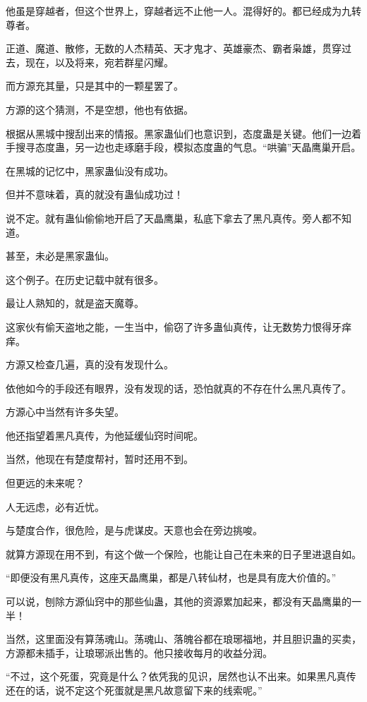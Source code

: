 \begin{this_body}
他虽是穿越者，但这个世界上，穿越者远不止他一人。混得好的。都已经成为九转尊者。

正道、魔道、散修，无数的人杰精英、天才鬼才、英雄豪杰、霸者枭雄，贯穿过去，现在，以及将来，宛若群星闪耀。

而方源充其量，只是其中的一颗星罢了。

方源的这个猜测，不是空想，他也有依据。

根据从黑城中搜刮出来的情报。黑家蛊仙们也意识到，态度蛊是关键。他们一边着手搜寻态度蛊，另一边也走琢磨手段，模拟态度蛊的气息。“哄骗”天晶鹰巢开启。

在黑城的记忆中，黑家蛊仙没有成功。

但并不意味着，真的就没有蛊仙成功过！

说不定。就有蛊仙偷偷地开启了天晶鹰巢，私底下拿去了黑凡真传。旁人都不知道。

甚至，未必是黑家蛊仙。

这个例子。在历史记载中就有很多。

最让人熟知的，就是盗天魔尊。

这家伙有偷天盗地之能，一生当中，偷窃了许多蛊仙真传，让无数势力恨得牙痒痒。

方源又检查几遍，真的没有发现什么。

依他如今的手段还有眼界，没有发现的话，恐怕就真的不存在什么黑凡真传了。

方源心中当然有许多失望。

他还指望着黑凡真传，为他延缓仙窍时间呢。

当然，他现在有楚度帮衬，暂时还用不到。

但更远的未来呢？

人无远虑，必有近忧。

与楚度合作，很危险，是与虎谋皮。天意也会在旁边挑唆。

就算方源现在用不到，有这个做一个保险，也能让自己在未来的日子里进退自如。

“即便没有黑凡真传，这座天晶鹰巢，都是八转仙材，也是具有庞大价值的。”

可以说，刨除方源仙窍中的那些仙蛊，其他的资源累加起来，都没有天晶鹰巢的一半！

当然，这里面没有算荡魂山。荡魂山、落魄谷都在琅琊福地，并且胆识蛊的买卖，方源都未插手，让琅琊派出售的。他只接收每月的收益分润。

“不过，这个死蛋，究竟是什么？依凭我的见识，居然也认不出来。如果黑凡真传还在的话，说不定这个死蛋就是黑凡故意留下来的线索呢。”


\end{this_body}

